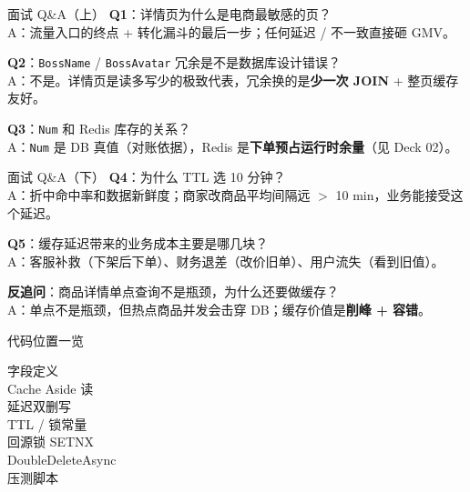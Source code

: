 \begin{frame}{面试 Q\&A（上）}
\textbf{Q1}：详情页为什么是电商最敏感的页？\\
\hspace{4mm}\small A：流量入口的终点 + 转化漏斗的最后一步；任何延迟 / 不一致直接砸 GMV。

\vspace{2mm}
\textbf{Q2}：\texttt{BossName} / \texttt{BossAvatar} 冗余是不是数据库设计错误？\\
\hspace{4mm}\small A：不是。详情页是读多写少的极致代表，冗余换的是\textbf{少一次 JOIN} + 整页缓存友好。

\vspace{2mm}
\textbf{Q3}：\texttt{Num} 和 Redis 库存的关系？\\
\hspace{4mm}\small A：\texttt{Num} 是 DB 真值（对账依据），Redis 是\textbf{下单预占运行时余量}（见 Deck 02）。
\end{frame}

\begin{frame}{面试 Q\&A（下）}
\textbf{Q4}：为什么 TTL 选 10 分钟？\\
\hspace{4mm}\small A：折中命中率和数据新鲜度；商家改商品平均间隔远 $>$ 10 min，业务能接受这个延迟。

\vspace{2mm}
\textbf{Q5}：缓存延迟带来的业务成本主要是哪几块？\\
\hspace{4mm}\small A：客服补救（下架后下单）、财务退差（改价旧单）、用户流失（看到旧值）。

\vspace{2mm}
\textbf{反追问}：商品详情单点查询不是瓶颈，为什么还要做缓存？\\
\hspace{4mm}\small A：单点不是瓶颈，但热点商品并发会击穿 DB；缓存价值是\textbf{削峰 + 容错}。
\end{frame}

\begin{frame}{代码位置一览}
\begin{description}
  \item[字段定义]
  \item[Cache Aside 读]
  \item[延迟双删写]
  \item[TTL / 锁常量]
  \item[回源锁 SETNX]
  \item[DoubleDeleteAsync]
  \item[压测脚本]
\end{description}
\vspace{2mm}
\end{frame}


